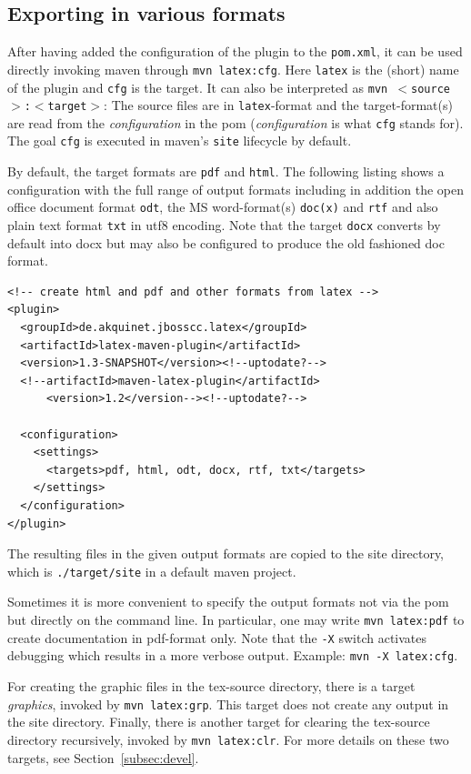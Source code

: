 \documentclass[12pt]{article}
\begin{document}
\subsection{Exporting in various formats}\label{sec:stableUsage}


After having added the configuration of the plugin to the {\tt pom.xml}, 
it can be used directly invoking maven through 
{\tt mvn latex:cfg}. 
Here {\tt latex} is the (short) name of the plugin and {\tt cfg} is the target. 
It can also be interpreted as {\tt mvn $<$source$>$:$<$target$>$}: 
The source files are in {\tt latex}-format and the target-format(s) 
are read from the {\em configuration} in the pom 
({\em configuration} is what {\tt cfg} stands for). 
The goal {\tt cfg} is executed in maven's {\tt site} lifecycle by default. 

By default, the target formats are {\tt pdf} and {\tt html}. 
The following listing shows a configuration 
with the full range of output formats including in addition 
the open office document format {\tt odt}, 
the MS word-format(s) {\tt doc(x)} and {\tt rtf}
and also plain text format {\tt txt} in utf8 encoding. 
Note that the target {\tt docx} converts by default into \gls{docx} 
but may also be configured to produce the old fashioned \gls{doc} format. 
%
\lstset{language=xml, basicstyle=\small}
\begin{lstlisting}
<!-- create html and pdf and other formats from latex -->
<plugin>
  <groupId>de.akquinet.jbosscc.latex</groupId>
  <artifactId>latex-maven-plugin</artifactId>
  <version>1.3-SNAPSHOT</version><!--uptodate?-->
  <!--artifactId>maven-latex-plugin</artifactId>
      <version>1.2</version--><!--uptodate?-->
	
  <configuration>
    <settings>
      <targets>pdf, html, odt, docx, rtf, txt</targets>
    </settings>
  </configuration>
</plugin>
\end{lstlisting}

The resulting files in the given output formats 
are copied to the site directory, 
which is {\tt ./target/site} in a default maven project. 

Sometimes it is more convenient 
to specify the output formats not via the pom 
but directly on the command line. 
In particular, one may write {\tt mvn latex:pdf} to create documentation 
in pdf-format only. 
Note that the {\tt -X} switch activates debugging 
which results in a more verbose output. 
Example: {\tt mvn -X latex:cfg}. 

For creating the graphic files in the tex-source directory, 
there is a target {\em graphics}, invoked by {\tt mvn latex:grp}. 
This target does not create any output in the site directory. 
Finally,  there is another target for clearing the tex-source directory 
recursively, invoked by {\tt mvn latex:clr}. 
For more details on these two targets, see Section~\ref{subsec:devel}. 
\end{document}
